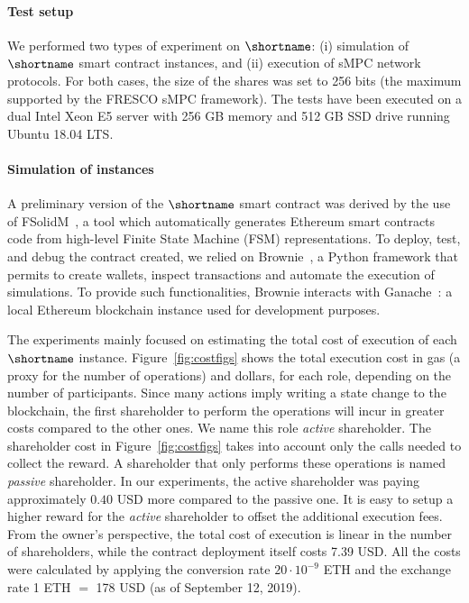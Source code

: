 \paragraph*{Test setup}
We performed two types of experiment on $\shortname$: (i) simulation of $\shortname$ smart contract instances, and (ii) execution of sMPC network protocols. 
For both cases, the size of the shares was set to 256 bits (the maximum supported by the FRESCO sMPC framework).
The tests have been executed on a dual Intel Xeon E5 server with 256 GB memory and 512 GB SSD drive running Ubuntu 18.04 LTS.

\medskip

\paragraph*{Simulation of \shortname instances}
A preliminary version of the $\shortname$ smart contract was derived by the use of FSolidM~\cite{Mavridou2017DesigningSE}, a tool which automatically generates Ethereum smart contracts code from high-level Finite State Machine (FSM) representations.
To deploy, test, and debug the contract created, we relied on Brownie~\cite{brownie}, a Python framework that permits to create wallets, inspect transactions and automate the execution of simulations.
To provide such functionalities, Brownie interacts with Ganache~\cite{ganache}: a local Ethereum blockchain instance used for development purposes.

The experiments mainly focused on estimating the total cost of execution of each $\shortname$ instance. 
Figure~\ref{fig:costfigs} shows the total execution cost in gas (a proxy for the number of operations) and dollars, for each role, depending on the number of participants.
%
Since many \shortname actions imply writing a state change to the blockchain, the first shareholder to perform the operations will incur in greater costs compared to the other ones. We name this role {\em active} shareholder.
The shareholder cost in Figure~\ref{fig:costfigs} takes into account only the calls needed to collect the reward. A shareholder that only performs these operations is named {\em passive} shareholder.
In our experiments, the active shareholder was paying approximately $0.40$ USD more compared to the passive one.
It is easy to setup a higher reward for the {\em active} shareholder to offset the additional execution fees.
From the owner's perspective, the total cost of execution is linear in the number of shareholders, while the contract deployment itself costs 7.39 USD.
All the costs were calculated by applying the conversion rate {$20 \cdot 10^{-9}$ ETH} and the exchange rate {1 ETH $=$ 178 USD} (as of September 12, 2019).

